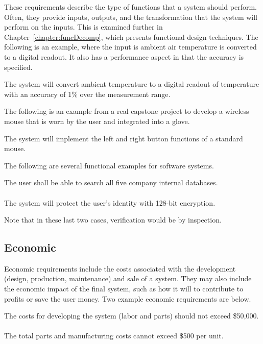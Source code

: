 These requirements describe the type of functions that a system should
perform. Often, they provide inputs, outputs, and the transformation
that the system will perform on the inputs. This is examined further in
Chapter~\ref{chapter:funcDecomp}, 
which presents functional design techniques. The following is
an example, where the input is ambient air temperature is converted to a
digital readout. It also has a performance aspect in that the accuracy
is specified.

\begin{itquote}
The system will convert ambient temperature to a digital readout of
temperature with an accuracy of 1\% over the measurement range.
\end{itquote}

The following is an example from a real capstone project to develop a
wireless mouse that is worn by the user and integrated into a glove.

\begin{itquote}
The system will implement the left and right button functions of a
standard mouse.
\end{itquote}

The following are several functional examples for software systems.

\begin{itquote}
The user shall be able to search all five company internal databases. \\ \\
The system will protect the user's identity with 128-bit encryption.
\end{itquote}

Note that in these last two cases, verification would be by inspection.


\subsection*{Economic}
\label{subsection:economic}

Economic requirements include the costs associated with the development
(design, production, maintenance) and sale of a system. They may also
include the economic impact of the final system, such as how it will to
contribute to profits or save the user money. Two example economic
requirements are below.

\begin{itquote}
The costs for developing the system (labor and parts) should not exceed
\$50,000. \\ \\
The total parts and manufacturing costs cannot exceed \$500 per unit.
\end{itquote}

